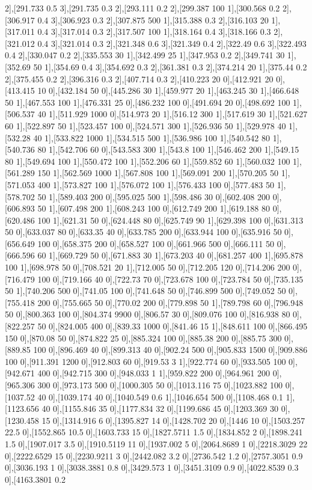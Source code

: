 {2],[291.733 0.5 3],[291.735 0.3 2],[293.111 0.2 2],[299.387 100 1],[300.568 0.2 2],[306.917 0.4 3],[306.923 0.3 2],[307.875 500 1],[315.388 0.3 2],[316.103 20 1],[317.011 0.4 3],[317.014 0.3 2],[317.507 100 1],[318.164 0.4 3],[318.166 0.3 2],[321.012 0.4 3],[321.014 0.3 2],[321.348 0.6 3],[321.349 0.4 2],[322.49 0.6 3],[322.493 0.4 2],[330.047 0.2 2],[335.553 30 1],[342.499 25 1],[347.953 0.2 2],[349.741 30 1],[352.69 50 1],[354.69 0.4 3],[354.692 0.3 2],[361.381 0.3 2],[374.214 20 1],[375.44 0.2 2],[375.455 0.2 2],[396.316 0.3 2],[407.714 0.3 2],[410.223 20 0],[412.921 20 0],[413.415 10 0],[432.184 50 0],[445.286 30 1],[459.977 20 1],[463.245 30 1],[466.648 50 1],[467.553 100 1],[476.331 25 0],[486.232 100 0],[491.694 20 0],[498.692 100 1],[506.537 40 1],[511.929 1000 0],[514.973 20 1],[516.12 300 1],[517.619 30 1],[521.627 60 1],[522.897 50 1],[523.457 100 0],[524.571 300 1],[526.936 50 1],[529.978 40 1],[532.28 40 1],[533.822 1000 1],[534.515 500 1],[536.986 100 1],[540.542 80 1],[540.736 80 1],[542.706 60 0],[543.583 300 1],[543.8 100 1],[546.462 200 1],[549.15 80 1],[549.694 100 1],[550.472 100 1],[552.206 60 1],[559.852 60 1],[560.032 100 1],[561.289 150 1],[562.569 1000 1],[567.808 100 1],[569.091 200 1],[570.205 50 1],[571.053 400 1],[573.827 100 1],[576.072 100 1],[576.433 100 0],[577.483 50 1],[578.702 50 1],[589.403 200 0],[595.025 500 1],[598.486 30 0],[602.408 200 0],[606.893 50 1],[607.498 200 1],[608.243 100 0],[612.749 200 1],[619.188 80 0],[620.486 100 1],[621.31 50 0],[624.448 80 0],[625.749 90 1],[629.398 100 0],[631.313 50 0],[633.037 80 0],[633.35 40 0],[633.785 200 0],[633.944 100 0],[635.916 50 0],[656.649 100 0],[658.375 200 0],[658.527 100 0],[661.966 500 0],[666.111 50 0],[666.596 60 1],[669.729 50 0],[671.883 30 1],[673.203 40 0],[681.257 400 1],[695.878 100 1],[698.978 50 0],[708.521 20 1],[712.005 50 0],[712.205 120 0],[714.206 200 0],[716.479 100 0],[719.166 40 0],[722.73 70 0],[723.678 100 0],[723.784 50 0],[735.135 50 1],[740.206 500 0],[741.05 100 0],[741.648 50 0],[746.899 500 0],[749.052 50 0],[755.418 200 0],[755.665 50 0],[770.02 200 0],[779.898 50 1],[789.798 60 0],[796.948 50 0],[800.363 100 0],[804.374 9900 0],[806.57 30 0],[809.076 100 0],[816.938 80 0],[822.257 50 0],[824.005 400 0],[839.33 1000 0],[841.46 15 1],[848.611 100 0],[866.495 150 0],[870.08 50 0],[874.822 25 0],[885.324 100 0],[885.38 200 0],[885.75 300 0],[889.85 100 0],[896.469 40 0],[899.313 40 0],[902.24 500 0],[905.833 1500 0],[909.886 100 0],[911.391 1200 0],[912.803 60 0],[919.53 3 1],[922.774 60 0],[933.505 100 0],[942.671 400 0],[942.715 300 0],[948.033 1 1],[959.822 200 0],[964.961 200 0],[965.306 300 0],[973.173 500 0],[1000.305 50 0],[1013.116 75 0],[1023.882 100 0],[1037.52 40 0],[1039.174 40 0],[1040.549 0.6 1],[1046.654 500 0],[1108.468 0.1 1],[1123.656 40 0],[1155.846 35 0],[1177.834 32 0],[1199.686 45 0],[1203.369 30 0],[1230.458 15 0],[1314.916 6 0],[1395.827 14 0],[1428.702 20 0],[1446 10 0],[1503.257 22.5 0],[1552.865 10.5 0],[1603.733 15 0],[1827.5711 1.5 0],[1834.852 2 0],[1898.241 1.5 0],[1907.017 3.5 0],[1910.5119 11 0],[1937.002 5 0],[2064.8689 1 0],[2218.3029 22 0],[2222.6529 15 0],[2230.9211 3 0],[2442.082 3.2 0],[2736.542 1.2 0],[2757.3051 0.9 0],[3036.193 1 0],[3038.3881 0.8 0],[3429.573 1 0],[3451.3109 0.9 0],[4022.8539 0.3 0],[4163.3801 0.2 }
